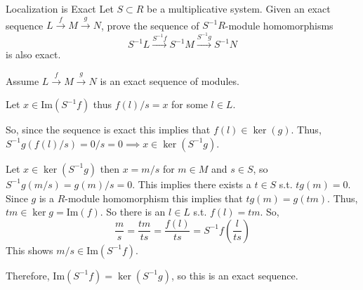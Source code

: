\documentclass[12pt, letterpaper]{article}
\begin{document}
\begin{problem}{}
    
\end{problem}
\begin{subproblem}{Localization is Exact}
    Let $S \subset R$ be a multiplicative system. Given an exact sequence
    $L \overset{f}{\longrightarrow} M \overset{g}{\longrightarrow} N$, prove the sequence of $S^{-1}R$-module homomorphisms
    \[S^{-1}L \overset{S^{-1}f}{\longrightarrow} S^{-1}M \overset{S^{-1}g}{\longrightarrow} S^{-1}N\]
    is also exact.
\end{subproblem}
\begin{problemproof}
    Assume $L \overset{f}{\longrightarrow} M \overset{g}{\longrightarrow} N$ is an exact sequence of modules.

    Let $x \in \mathrm{Im}(S^{-1}f)$ thus $f(l)/s=x$ for some $l \in L$.

    So, since the sequence is exact this implies that $f(l) \in \ker(g)$. Thus, $S^{-1}g(f(l)/s)=0/s=0 \implies x \in \ker(S^{-1}g)$.
    
    Let  $x \in \ker(S^{-1}g)$ then $x=m/s$ for $m \in M$ and $s \in S$, so $S^{-1}g(m/s)=g(m)/s=0$. This implies there exists a $t \in S$ s.t. $tg(m)=0$. Since $g$ is
    a $R$-module homomorphism this implies that $tg(m)=g(tm)$. Thus, $tm \in \ker{g} = \mathrm{Im}(f)$. So there is an $l \in L$ s.t. $f(l)=tm$. So,
    \[\frac{m}{s}=\frac{tm}{ts}=\frac{f(l)}{ts}=S^{-1}f\left( \frac{l}{ts} \right)\]
    This shows $m/s \in \mathrm{Im}(S^{-1}f)$.

    Therefore, $\mathrm{Im}(S^{-1}f)=\ker(S^{-1}g)$, so this is an exact sequence.
\end{problemproof}
\end{document}
